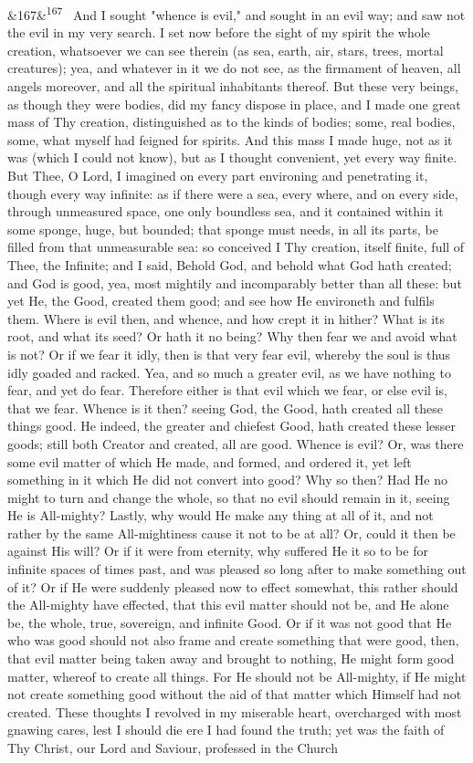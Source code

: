 \documentclass[12pt]{article}
\newcommand{\para}[1][]{\par\noindent\ifx&#1&\else\textsuperscript{\footnotesize #1}~\fi}
\begin{document}
\para[167] And I sought "whence is evil," and sought in an evil way; and saw not the evil in my very search. I set now before the sight of my spirit the whole creation, whatsoever we can see therein (as sea, earth, air, stars, trees, mortal creatures); yea, and whatever in it we do not see, as the firmament of heaven, all angels moreover, and all the spiritual inhabitants thereof. But these very beings, as though they were bodies, did my fancy dispose in place, and I made one great mass of Thy creation, distinguished as to the kinds of bodies; some, real bodies, some, what myself had feigned for spirits. And this mass I made huge, not as it was (which I could not know), but as I thought convenient, yet every way finite. But Thee, O Lord, I imagined on every part environing and penetrating it, though every way infinite: as if there were a sea, every where, and on every side, through unmeasured space, one only boundless sea, and it contained within it some sponge, huge, but bounded; that sponge must needs, in all its parts, be filled from that unmeasurable sea: so conceived I Thy creation, itself finite, full of Thee, the Infinite; and I said, Behold God, and behold what God hath created; and God is good, yea, most mightily and incomparably better than all these: but yet He, the Good, created them good; and see how He environeth and fulfils them. Where is evil then, and whence, and how crept it in hither? What is its root, and what its seed? Or hath it no being? Why then fear we and avoid what is not? Or if we fear it idly, then is that very fear evil, whereby the soul is thus idly goaded and racked. Yea, and so much a greater evil, as we have nothing to fear, and yet do fear. Therefore either is that evil which we fear, or else evil is, that we fear. Whence is it then? seeing God, the Good, hath created all these things good. He indeed, the greater and chiefest Good, hath created these lesser goods; still both Creator and created, all are good. Whence is evil? Or, was there some evil matter of which He made, and formed, and ordered it, yet left something in it which He did not convert into good? Why so then? Had He no might to turn and change the whole, so that no evil should remain in it, seeing He is All-mighty? Lastly, why would He make any thing at all of it, and not rather by the same All-mightiness cause it not to be at all? Or, could it then be against His will? Or if it were from eternity, why suffered He it so to be for infinite spaces of times past, and was pleased so long after to make something out of it? Or if He were suddenly pleased now to effect somewhat, this rather should the All-mighty have effected, that this evil matter should not be, and He alone be, the whole, true, sovereign, and infinite Good. Or if it was not good that He who was good should not also frame and create something that were good, then, that evil matter being taken away and brought to nothing, He might form good matter, whereof to create all things. For He should not be All-mighty, if He might not create something good without the aid of that matter which Himself had not created. These thoughts I revolved in my miserable heart, overcharged with most gnawing cares, lest I should die ere I had found the truth; yet was the faith of Thy Christ, our Lord and Saviour, professed in the Church 
\end{document}
